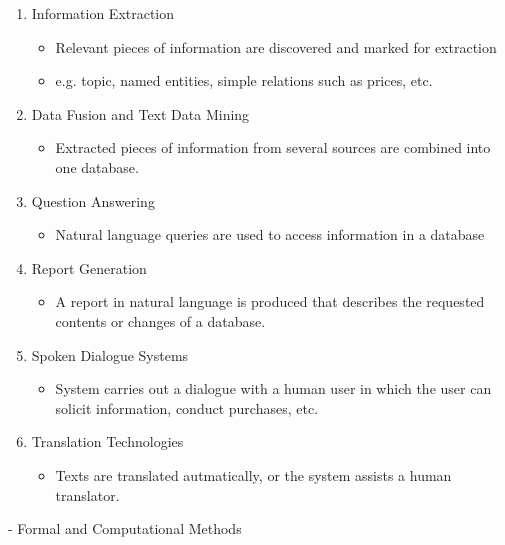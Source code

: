 \documentclass[11pt]{article}
\newenvironment{itemise}{
\begin{itemize}
  \setlength{\itemsep}{1pt}
  \setlength{\parskip}{0pt}
  \setlength{\parsep}{0pt}
}{\end{itemize}}
\begin{document}
\begin{enumerate}
 \item Information Extraction
\begin{itemise}
 \item Relevant pieces of information are discovered and marked for extraction
 \item e.g. topic, named entities, simple relations such as prices, etc.
\end{itemise}
 \item Data Fusion and Text Data Mining
\begin{itemise}
 \item Extracted pieces of information from several sources are combined into one database.
\end{itemise}
 \item Question Answering
\begin{itemise}
 \item Natural language queries are used to access information in a database
\end{itemise}
 \item Report Generation
\begin{itemise}
 \item A report in natural language is produced that describes the requested contents or changes of a database.
\end{itemise}
 \item Spoken Dialogue Systems
\begin{itemise}
 \item System carries out a dialogue with a human user in which the user can solicit information, conduct purchases, etc.
\end{itemise}
 \item Translation Technologies
\begin{itemise}
 \item Texts are translated autmatically, or the system assists a human translator.
\end{itemise}
\end{enumerate}
- Formal and Computational Methods
\end{document}

